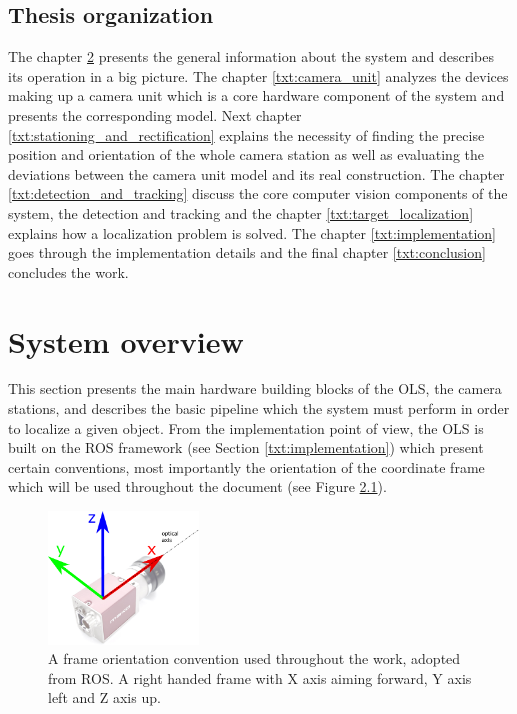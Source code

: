 \section{Thesis organization}

The chapter \ref{txt:system_overview} presents the general information about the system and describes its operation in a big picture. The chapter \ref{txt:camera_unit} analyzes the devices making up a camera unit which is a core hardware component of the system and presents the corresponding model. Next chapter \ref{txt:stationing_and_rectification} explains the necessity of finding the precise position and orientation of the whole camera station as well as evaluating the deviations between the camera unit model and its real construction. The chapter \ref{txt:detection_and_tracking} discuss the core computer vision components of the system, the detection and tracking and the chapter \ref{txt:target_localization} explains how a localization problem is solved. The chapter \ref{txt:implementation} goes through the implementation details and the final chapter \ref{txt:conclusion} concludes the work.


\chapter{System overview} \label{txt:system_overview}

This section presents the main hardware building blocks of the OLS, the camera stations, and describes the basic pipeline which the system must perform in order to localize a given object. From the implementation point of view, the OLS is built on the ROS framework (see Section \ref{txt:implementation}) which present certain conventions, most importantly the orientation of the coordinate frame which will be used throughout the document (see Figure \ref{fig:frame_convention}).

\begin{figure}[htb]
	\centering
	\includegraphics[width=4cm]{fig/frame_convention.pdf}
	\caption{A frame orientation convention used throughout the work, adopted from ROS. A right handed frame with X axis aiming forward, Y axis left and Z axis up.}
	\label{fig:frame_convention}
\end{figure}

